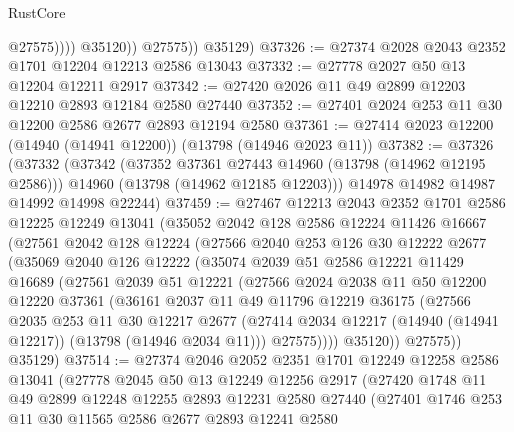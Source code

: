\begin{lexlean}{RustCore}
\begin{coremodule}
                      @27575))))
              @35120))
          @27575))
      @35129)
@37326 := @27374 @2028 @2043 @2352 @1701 @12204 @12213 @2586 @13043
@37332 := @27778 @2027 @50 @13 @12204 @12211 @2917
@37342 := @27420 @2026 @11 @49 @2899 @12203 @12210 @2893 @12184 @2580 @27440
@37352 := @27401 @2024 @253 @11 @30 @12200 @2586 @2677 @2893 @12194 @2580
@37361 := @27414 @2023 @12200 (@14940 (@14941 @12200)) (@13798 (@14946 @2023 @11))
@37382 := @37326
    (@37332
      (@37342
        (@37352 @37361 @27443 @14960 (@13798 (@14962 @12195 @2586)))
        @14960
        (@13798 (@14962 @12185 @12203)))
      @14978
      @14982
      @14987
      @14992
      @14998
      @22244)
@37459 := @27467
    @12213
    @2043
    @2352
    @1701
    @2586
    @12225
    @12249
    @13041
    (@35052
      @2042
      @128
      @2586
      @12224
      @11426
      @16667
      (@27561
        @2042
        @128
        @12224
        (@27566
          @2040
          @253
          @126
          @30
          @12222
          @2677
          (@35069
            @2040
            @126
            @12222
            (@35074
              @2039
              @51
              @2586
              @12221
              @11429
              @16689
              (@27561
                @2039
                @51
                @12221
                (@27566
                  @2024
                  @2038
                  @11
                  @50
                  @12200
                  @12220
                  @37361
                  (@36161
                    @2037
                    @11
                    @49
                    @11796
                    @12219
                    @36175
                    (@27566
                      @2035
                      @253
                      @11
                      @30
                      @12217
                      @2677
                      (@27414 @2034 @12217 (@14940 (@14941 @12217)) (@13798 (@14946 @2034 @11)))
                      @27575))))
              @35120))
          @27575))
      @35129)
@37514 := @27374
    @2046
    @2052
    @2351
    @1701
    @12249
    @12258
    @2586
    @13041
    (@27778
      @2045
      @50
      @13
      @12249
      @12256
      @2917
      (@27420
        @1748
        @11
        @49
        @2899
        @12248
        @12255
        @2893
        @12231
        @2580
        @27440
        (@27401
          @1746
          @253
          @11
          @30
          @11565
          @2586
          @2677
          @2893
          @12241
          @2580

\end{coremodule}
\end{lexlean}
